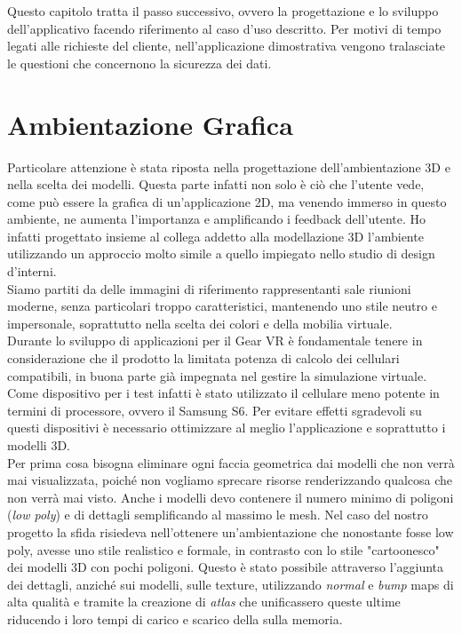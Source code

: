 Questo capitolo tratta il passo successivo, ovvero la progettazione e lo sviluppo dell'applicativo facendo riferimento al caso d'uso descritto. Per motivi di tempo legati alle richieste del cliente, nell'applicazione dimostrativa  vengono tralasciate le questioni che concernono la sicurezza dei dati.

\section{Ambientazione Grafica}
Particolare attenzione è stata riposta nella progettazione dell'ambientazione 3D e nella scelta dei modelli. Questa parte infatti non solo è ciò che l'utente vede, come può essere la grafica di un'applicazione 2D, ma venendo immerso in questo ambiente, ne aumenta l'importanza e amplificando i feedback dell'utente. Ho infatti progettato insieme al collega addetto alla modellazione 3D l'ambiente utilizzando un approccio molto simile a quello impiegato nello studio di design d'interni.\\
Siamo partiti da delle immagini di riferimento rappresentanti sale riunioni moderne, senza particolari troppo caratteristici, mantenendo uno stile neutro e impersonale, soprattutto nella scelta dei colori e della mobilia virtuale.\\
Durante lo sviluppo di applicazioni per il Gear VR è fondamentale tenere in considerazione che il prodotto la limitata potenza di calcolo dei cellulari compatibili, in buona parte già impegnata nel gestire la simulazione virtuale. Come dispositivo per i test infatti è stato utilizzato il cellulare meno potente in termini di processore, ovvero il Samsung S6. Per evitare effetti sgradevoli su questi dispositivi è necessario ottimizzare al meglio l'applicazione e soprattutto i modelli 3D.\\
Per prima cosa bisogna eliminare ogni faccia geometrica dai modelli che non verrà mai visualizzata, poiché non vogliamo sprecare risorse renderizzando qualcosa che non verrà mai visto. Anche i modelli devo contenere il numero minimo di poligoni (\textit{low poly}) e di dettagli semplificando al massimo le mesh. Nel caso del nostro progetto la sfida risiedeva nell'ottenere un'ambientazione che nonostante fosse low poly, avesse uno stile realistico e formale, in contrasto con lo stile "cartoonesco" dei modelli 3D con pochi poligoni. Questo è stato possibile attraverso l'aggiunta dei dettagli, anziché sui modelli, sulle texture, utilizzando \textit{normal} e \textit{bump} maps di alta qualità e tramite la creazione di \textit{atlas} che unificassero queste ultime riducendo i loro tempi di carico e scarico della sulla memoria. 
